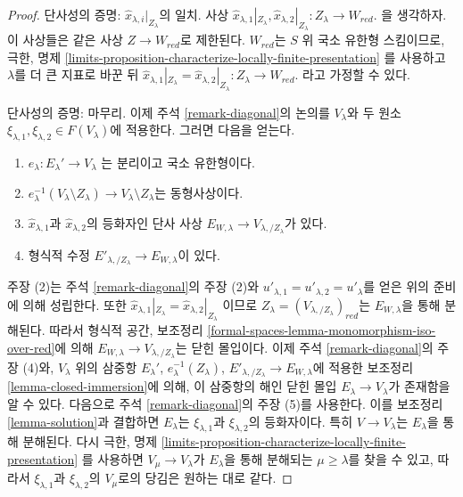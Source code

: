 \begin{proof}
\medskip\noindent
단사성의 증명: $\hat x_{\lambda, i}|_{Z_\lambda}$의 일치.
사상
$\hat x_{\lambda, 1}|_{Z_\lambda}, \hat x_{\lambda, 2}|_{Z_\lambda} :
Z_\lambda \to W_{red}$.
을 생각하자. 이 사상들은 같은 사상 $Z \to W_{red}$로 제한된다.
$W_{red}$는 $S$ 위 국소 유한형 스킴이므로, 극한, 명제
\ref{limits-proposition-characterize-locally-finite-presentation}
를 사용하고 $\lambda$를 더 큰 지표로 바꾼 뒤
$\hat x_{\lambda, 1}|_{Z_\lambda} = \hat x_{\lambda, 2}|_{Z_\lambda} :
Z_\lambda \to W_{red}$.
라고 가정할 수 있다.

\medskip\noindent
단사성의 증명: 마무리.
이제 주석 \ref{remark-diagonal}의 논의를 $V_\lambda$와 두 원소
$\xi_{\lambda, 1}, \xi_{\lambda, 2} \in F(V_\lambda)$에 적용한다.
그러면 다음을 얻는다.
\begin{enumerate}
\item $e_\lambda : E_\lambda' \to V_\lambda$
는 분리이고 국소 유한형이다.
\item $e_\lambda^{-1}(V_\lambda \setminus Z_\lambda) \to
V_\lambda \setminus Z_\lambda$는 동형사상이다.
\item $\hat x_{\lambda, 1}$과 $\hat x_{\lambda, 2}$의 등화자인
단사 사상 $E_{W, \lambda} \to V_{\lambda, /Z_\lambda}$가 있다.
\item 형식적 수정 $E'_{\lambda, /Z_\lambda} \to E_{W, \lambda}$이 있다.
\end{enumerate}
주장 (2)는 주석 \ref{remark-diagonal}의 주장 (2)와
$u'_{\lambda, 1} = u'_{\lambda, 2} = u'_\lambda$를 얻은 위의 준비에 의해 성립한다.
또한
$\hat x_{\lambda, 1}|_{Z_\lambda} = \hat x_{\lambda, 2}|_{Z_\lambda}$
이므로 $Z_\lambda = (V_{\lambda, /Z_\lambda})_{red}$는
$E_{W, \lambda}$을 통해 분해된다. 따라서 형식적 공간, 보조정리
\ref{formal-spaces-lemma-monomorphism-iso-over-red}에 의해
$E_{W, \lambda} \to V_{\lambda, /Z_\lambda}$는 닫힌 몰입이다.
이제 주석 \ref{remark-diagonal}의 주장 (4)와, $V_\lambda$ 위의 삼중항
$E_\lambda'$, $e_\lambda^{-1}(Z_\lambda)$,
$E'_{\lambda, /Z_\lambda} \to E_{W, \lambda}$에 적용한 보조정리
\ref{lemma-closed-immersion}에 의해, 이 삼중항의 해인 닫힌 몰입
$E_\lambda \to V_\lambda$가 존재함을 알 수 있다.
다음으로 주석 \ref{remark-diagonal}의 주장 (5)를 사용한다.
이를 보조정리 \ref{lemma-solution}과 결합하면 $E_\lambda$는
$\xi_{\lambda, 1}$과 $\xi_{\lambda, 2}$의 등화자이다.
특히 $V \to V_\lambda$는 $E_\lambda$을 통해 분해된다.
다시 극한, 명제
\ref{limits-proposition-characterize-locally-finite-presentation}
를 사용하면 $V_\mu \to V_\lambda$가 $E_\lambda$을 통해 분해되는
$\mu \geq \lambda$를 찾을 수 있고, 따라서
$\xi_{\lambda, 1}$과 $\xi_{\lambda, 2}$의 $V_\mu$로의 당김은
원하는 대로 같다.


\end{proof}
